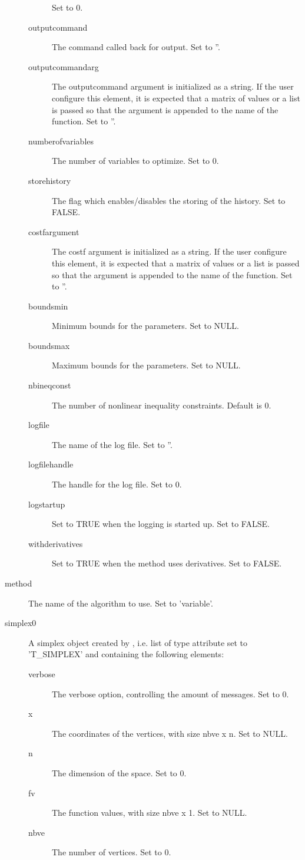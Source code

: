 \begin{Value}
\begin{description}
\begin{description}
Set to 0.
\item[outputcommand] The command called back for output. Set to ''.
\item[outputcommandarg] The outputcommand argument is initialized as a
string. If the user configure this element, it is expected that a matrix
of values or a list is passed so that the argument is appended to the
name of the function. Set to ''.
\item[numberofvariables] The number of variables to optimize. Set to
0.
\item[storehistory] The flag which enables/disables the storing of the
history. Set to FALSE.
\item[costfargument] The costf argument is initialized as a string. If
the user configure this element, it is expected that a matrix of values
or a list is passed so that the argument is appended to the name of the
function. Set to ''.
\item[boundsmin] Minimum bounds for the parameters. Set to NULL.
\item[boundsmax] Maximum bounds for the parameters. Set to NULL.
\item[nbineqconst] The number of nonlinear inequality constraints. Default
is 0.
\item[logfile] The name of the log file. Set to ''.
\item[logfilehandle] The handle for the log file. Set to 0.
\item[logstartup] Set to TRUE when the logging is started up. Set to
FALSE.
\item[withderivatives] Set to TRUE when the method uses derivatives.
Set to FALSE.

\end{description}


\item[method] The name of the algorithm to use. Set to 'variable'.
\item[simplex0] A simplex object created by
, i.e. list of type attribute set to
'T\_SIMPLEX' and containing the following elements:\begin{description}

\item[verbose] The verbose option, controlling the amount of messages.
Set to 0.
\item[x] The coordinates of the vertices, with size nbve x n. Set
to NULL.
\item[n] The dimension of the space. Set to 0.
\item[fv] The function values, with size nbve x 1. Set to NULL.
\item[nbve] The number of vertices. Set to 0.


\end{description}
\end{description}
\end{Value}
